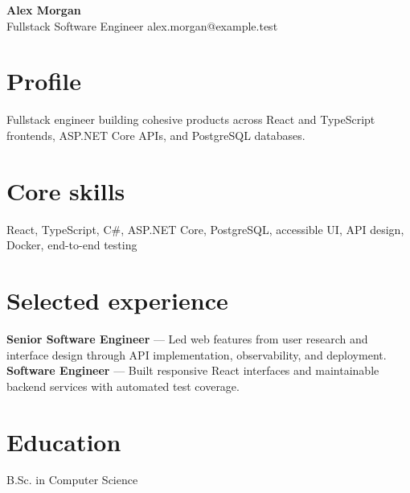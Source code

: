 \documentclass[10pt]{article}
\begin{document}
{\Huge\textbf{Alex Morgan}}\\[3pt]
{\large Fullstack Software Engineer} \hfill alex.morgan@example.test

\section*{Profile}
Fullstack engineer building cohesive products across React and TypeScript frontends, ASP.NET Core APIs, and PostgreSQL databases.

\section*{Core skills}
React, TypeScript, C\#, ASP.NET Core, PostgreSQL, accessible UI, API design, Docker, end-to-end testing

\section*{Selected experience}
\textbf{Senior Software Engineer} --- Led web features from user research and interface design through API implementation, observability, and deployment.\\[4pt]
\textbf{Software Engineer} --- Built responsive React interfaces and maintainable backend services with automated test coverage.

\section*{Education}
B.Sc. in Computer Science
\end{document}
